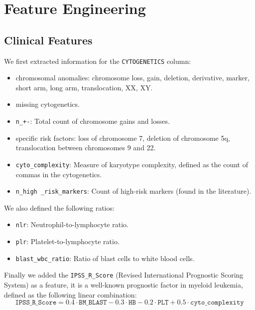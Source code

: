 \documentclass{article}
\begin{document}
\section{Feature Engineering}
\subsection{Clinical Features}
We first extracted information for the \texttt{CYTOGENETICS} column:
\begin{itemize}
    \item chromosomal anomalies: chromosome loss, gain, deletion, derivative, marker, short arm, long arm, translocation, XX, XY.
    \item missing cytogenetics.
    \item \texttt{n\_+-}: Total count of chromosome gains and losses.
    \item specific risk factors:  loss of chromosome 7, deletion of chromosome 5q, translocation between chromosomes 9 and 22.
    \item \texttt{cyto\_complexity}: Measure of karyotype complexity, defined as the count of commas in the cytogenetics.
    \item \texttt{n\_high \_risk\_markers}: Count of high-risk markers (found in the literature).
\end{itemize}

We also defined the following ratios:
\begin{itemize}
    \item \texttt{nlr}: Neutrophil-to-lymphocyte ratio.
    \item \texttt{plr}: Platelet-to-lymphocyte ratio.
    \item \texttt{blast\_wbc\_ratio}: Ratio of blast cells to white blood cells.
\end{itemize}

Finally we added the \texttt{IPSS\_R\_Score} (Revised International Prognostic Scoring System) as a feature, it is a well-known prognostic factor in myeloid leukemia, defined as the following linear combination:
\begin{equation}
    \texttt{IPSS\_R\_Score} = 0.4 \cdot \texttt{BM\_BLAST} - 0.3 \cdot \texttt{HB} - 0.2 \cdot \texttt{PLT} + 0.5 \cdot \texttt{cyto\_complexity}
\end{equation}
\end{document}
